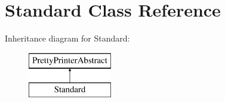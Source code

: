 \section{Standard Class Reference}
\label{class_php_parser_1_1_pretty_printer_1_1_standard}
Inheritance diagram for Standard\+:\begin{figure}[H]
\begin{center}
\leavevmode
\includegraphics[height=2.000000cm]{class_php_parser_1_1_pretty_printer_1_1_standard}
\end{center}
\end{figure}
